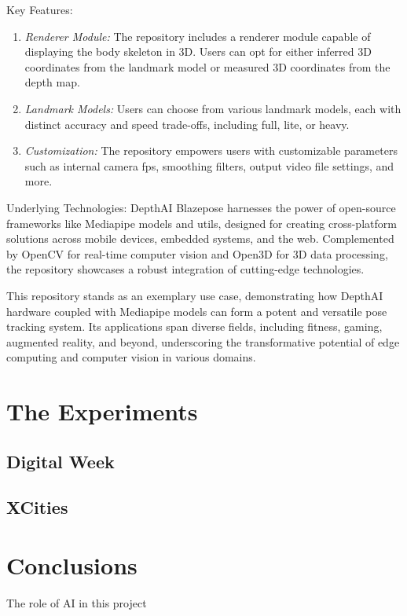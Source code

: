 \documentclass{Configuration_Files/PoliMi3i_thesis}
\begin{document}
Key Features:

\begin{enumerate}
    \item \textit{Renderer Module:} The repository includes a renderer module capable of displaying the body skeleton in 3D. Users can opt for either inferred 3D coordinates from the landmark model or measured 3D coordinates from the depth map.
    \item \textit{Landmark Models:} Users can choose from various landmark models, each with distinct accuracy and speed trade-offs, including full, lite, or heavy.
    \item \textit{Customization:} The repository empowers users with customizable parameters such as internal camera fps, smoothing filters, output video file settings, and more.
\end{enumerate}
Underlying Technologies: DepthAI Blazepose harnesses the power of open-source frameworks like Mediapipe models and utils, designed for creating cross-platform solutions across mobile devices, embedded systems, and the web. Complemented by OpenCV for real-time computer vision and Open3D for 3D data processing, the repository showcases a robust integration of cutting-edge technologies.

This repository stands as an exemplary use case, demonstrating how DepthAI hardware coupled with Mediapipe models can form a potent and versatile pose tracking system. Its applications span diverse fields, including fitness, gaming, augmented reality, and beyond, underscoring the transformative potential of edge computing and computer vision in various domains.
 
\chapter{The Experiments}

\section{Digital Week}

\section{XCities}

\chapter{Conclusions} 
The role of AI in this project
\end{document}
